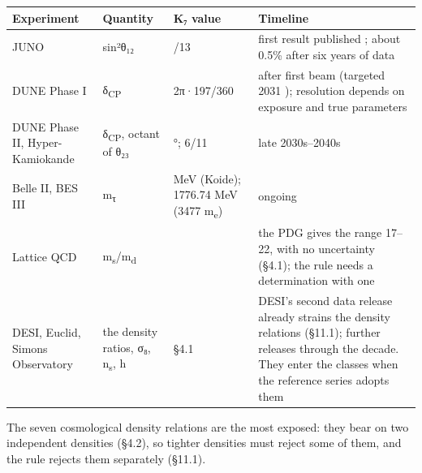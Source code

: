\documentclass[11pt,a4paper]{article}
\begin{document}
\begin{longtable}[]{@{}
  >{\raggedright\arraybackslash}p{}
  >{\raggedright\arraybackslash}p{}
  >{\raggedright\arraybackslash}p{}
  >{\raggedright\arraybackslash}p{}@{}}
\toprule\noalign{}
\begin{minipage}[b]{\linewidth}\raggedright
Experiment
\end{minipage} & \begin{minipage}[b]{\linewidth}\raggedright
Quantity
\end{minipage} & \begin{minipage}[b]{\linewidth}\raggedright
K₇ value
\end{minipage} & \begin{minipage}[b]{\linewidth}\raggedright
Timeline
\end{minipage} \\
\midrule\noalign{}
\endhead
\bottomrule\noalign{}
\endlastfoot
JUNO & sin²θ₁₂ & 4/13 & first result published \cite{58}; about 0.5\% after six years of data \cite{59} \\
DUNE Phase I & δ\textsubscript{CP} & 2π·197/360 & after first beam (targeted 2031 \cite{47}); resolution depends on exposure and true parameters \cite{30,31} \\
DUNE Phase II, Hyper-Kamiokande & δ\textsubscript{CP}, octant of θ₂₃ & 197°; 6/11 & late 2030s--2040s \\
Belle II, BES III & m\textsubscript{τ} & 1776.97 MeV (Koide); 1776.74 MeV (3477 m\textsubscript{e}) & ongoing \cite{52} \\
Lattice QCD & m\textsubscript{s}/m\textsubscript{d} & 20 & the PDG gives the range 17--22, with no uncertainty (§4.1); the rule needs a determination with one \\
DESI, Euclid, Simons Observatory & the density ratios, σ₈, n\textsubscript{s}, h & §4.1 & DESI's second data release already strains the density relations (§11.1); further releases through the decade. They enter the classes when the reference series adopts them \\
\end{longtable}

The seven cosmological density relations are the most exposed: they bear on two independent densities (§4.2), so tighter densities must reject some of them, and the rule rejects them separately (§11.1).
\end{document}

